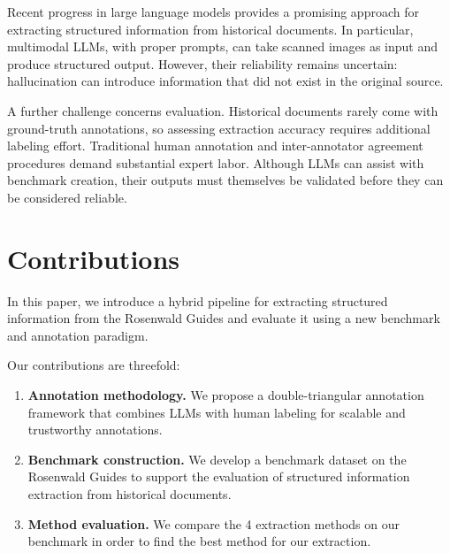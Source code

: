 Recent progress in large language models provides a promising approach for extracting structured information from historical documents. In particular, multimodal LLMs, with proper prompts, can take scanned images as input and produce structured output. However, their reliability remains uncertain: hallucination can introduce information that did not exist in the original source.

A further challenge concerns evaluation. Historical documents rarely come with ground-truth annotations, so assessing extraction accuracy requires additional labeling effort. Traditional human annotation and inter-annotator agreement procedures demand substantial expert labor. Although LLMs can assist with benchmark creation, their outputs must themselves be validated before they can be considered reliable.


\section{Contributions}
In this paper, we introduce a hybrid pipeline for extracting structured information from the Rosenwald Guides and evaluate it using a new benchmark and annotation paradigm.

Our contributions are threefold:
\begin{enumerate}
    \item \textbf{Annotation methodology.} We propose a double-triangular annotation framework that combines LLMs with human labeling for scalable and trustworthy annotations.
    \item \textbf{Benchmark construction.} We develop a benchmark dataset on the Rosenwald Guides to support the evaluation of structured information extraction from historical documents.
    \item \textbf{Method evaluation.} We compare the 4 extraction methods on our benchmark in order to find the best method for our extraction.
\end{enumerate}

